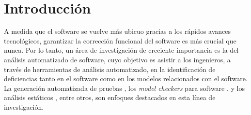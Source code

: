 \chapter[Introducción]{Introducción}
\label{cap:introduccion}














A medida que el software se vuelve más ubicuo gracias a los rápidos avances tecnológicos, garantizar la corrección funcional del software es más crucial que nunca. Por lo tanto, un área de investigación de creciente importancia es la del análisis automatizado de software, cuyo objetivo es asistir a los ingenieros, a través de herramientas de análisis automatizado, en la identificación de deficiencias tanto en el software como en los modelos relacionados con el software. La generación automatizada de pruebas \cite{Ponzio:2016, Rosner15, Abad13, Galeotti:2010, Khalek:2011, Pasareanu:2010, Gligoric10, Tillmann:2008, Pacheco07}, los \emph{model checkers} para software \cite{Visser06, Visser05, Clarke:2004}, y los análisis estáticos \cite{Calcagno:2011, Itzhaky:2014}, entre otros, son enfoques destacados en esta línea de investigación.

